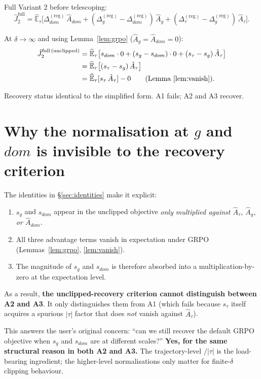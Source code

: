 \documentclass[11pt]{article}
\newcommand{\Ehat}{\widehat{\mathbb{E}}}
\begin{document}
Full Variant 2 before telescoping:
\[
\hat J_2^{\text{full}}
  = \Ehat_\tau\bigl[\Delta_{dom}^{(\text{reg})}\,\hat A_{dom}
       + (\Delta_g^{(\text{reg})}-\Delta_{dom}^{(\text{reg})})\,\hat A_g
       + (\Delta_\tau^{(\text{reg})}-\Delta_g^{(\text{reg})})\,\hat A_\tau\bigr].
\]

At $\delta\to\infty$ and using Lemma~\ref{lem:grpo} ($\hat A_g = \hat A_{dom} = 0$):
\begin{align*}
\hat J_2^{\text{full}\,(\text{unclipped})}
  &= \Ehat_\tau\bigl[s_{dom}\cdot 0 + (s_g-s_{dom})\cdot 0 + (s_\tau-s_g)\,\hat A_\tau\bigr] \\
  &= \Ehat_\tau\bigl[(s_\tau-s_g)\,\hat A_\tau\bigr] \\
  &= \Ehat_\tau[s_\tau\,\hat A_\tau] - 0
   \qquad\text{(Lemma~\ref{lem:vanish})}.
\end{align*}

Recovery status identical to the simplified form. A1 fails; A2 and A3
recover.

\section{Why the normalisation at $g$ and $dom$ is invisible to the recovery criterion}

The identities in \S\ref{sec:identities} make it explicit:

\begin{enumerate}
\item $s_g$ and $s_{dom}$ appear in the unclipped objective \emph{only
multiplied against $\hat A_\tau$, $\hat A_g$, or $\hat A_{dom}$}.
\item All three advantage terms vanish in expectation under GRPO
(Lemmas~\ref{lem:grpo}, \ref{lem:vanish}).
\item The magnitude of $s_g$ and $s_{dom}$ is therefore absorbed into a
multiplication-by-zero at the expectation level.
\end{enumerate}

As a result, \textbf{the unclipped-recovery criterion cannot distinguish
between A2 and A3}. It only distinguishes them from A1 (which fails because
$s_\tau$ itself acquires a spurious $|\tau|$ factor that does \emph{not}
vanish against $\hat A_\tau$).

This answers the user's original concern: ``can we still recover the
default GRPO objective when $s_g$ and $s_{dom}$ are at different scales?''
\textbf{Yes, for the same structural reason in both A2 and A3.} The
trajectory-level $/|\tau|$ is the load-bearing ingredient; the higher-level
normalisations only matter for finite-$\delta$ clipping behaviour.
\end{document}
